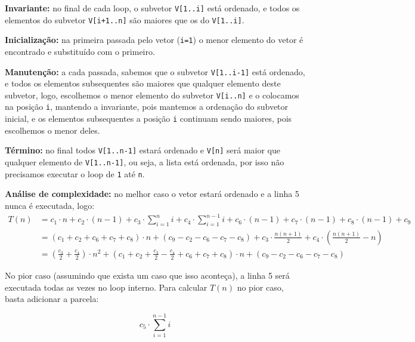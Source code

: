 \documentclass{article}
\begin{document}
\begin{enumerate}
	\textbf{Invariante:} no final de cada loop, o subvetor \texttt{V[1..i]}
	está ordenado, e todos os elementos do subvetor \texttt{V[i+1..n]} são
	maiores que os do \texttt{V[1..i]}.

	\textbf{Inicialização:} na primeira passada pelo vetor (\texttt{i=1}) o
	menor elemento do vetor é encontrado e substituído com o primeiro.

	\textbf{Manutenção:} a cada passada, sabemos que o subvetor
	\texttt{V[1..i-1]} está ordenado, e todos os elementos subsequentes são
	maiores que qualquer elemento deste subvetor, logo, escolhemos o menor
	elemento do subvetor \texttt{V[i..n]} e o colocamos na posição \texttt{i},
	mantendo a invariante, pois mantemos a ordenação do subvetor inicial, e os
	elementos subsequentes a posição \texttt{i} continuam sendo maiores, pois
	escolhemos o menor deles.

	\textbf{Término:} no final todos \texttt{V[1..n-1]} estará ordenado e
	\texttt{V[n]} será maior que qualquer elemento de \texttt{V[1..n-1]}, ou
	seja, a lista está ordenada, por isso não precisamos executar o loop de
	\texttt{1} até \texttt{n}.

	\textbf{Análise de complexidade:} no melhor caso o vetor estará ordenado e
	a linha 5 nunca é executada, logo:
	\begin{align*}
	T(n) &= c_1 \cdot n + c_2 \cdot (n-1) + c_3 \cdot \sum_{i=1}^{n}i + c_4
	\cdot \sum_{i=1}^{n-1}i + c_6 \cdot (n-1) + c_7 \cdot (n-1) + c_8 \cdot
	(n-1) + c_9 \\
	&= (c_1 + c_2 + c_6 + c_7 + c_8) \cdot n + (c_9-c_2-c_6-c_7-c_8) + c_3
	\cdot \frac{n(n+1)}{2} + c_4 \cdot \left ( \frac{n(n+1)}{2} - n \right ) \\
	&= \left ( \frac{c_3}{2} + \frac{c_4}{2} \right ) \cdot n^2 + \left ( c_1 +
	c_2 + \frac{c_3}{2} - \frac{c_4}{2} + c_6 + c_7 + c_8 \right ) \cdot n +
	(c_9-c_2-c_6-c_7-c_8)
	\end{align*}

	No pior caso (assumindo que exista um caso que isso aconteça), a linha 5
	será executada todas as vezes no loop interno. Para calcular $T(n)$ no pior
	caso, basta adicionar a parcela:

	$$ c_5 \cdot \sum_{i=1}^{n-1}i $$

\end{enumerate}
\end{document}

